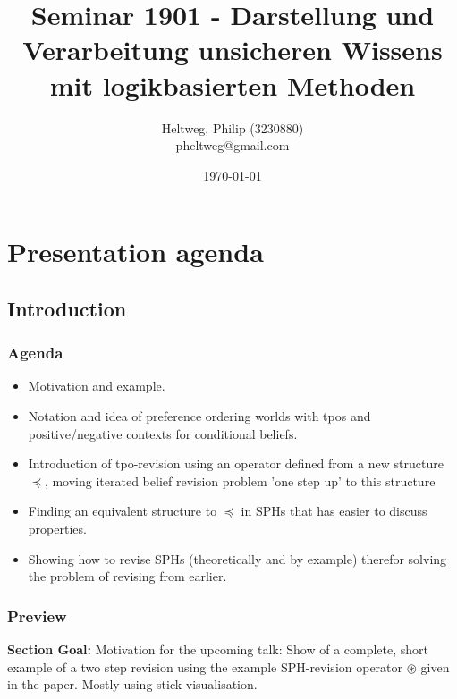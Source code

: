\documentclass[11pt]{article}
\begin{document}
\title{Seminar 1901 - Darstellung und Verarbeitung unsicheren Wissens mit logikbasierten Methoden}
\author{
	Heltweg, Philip (3230880) \\
	pheltweg@gmail.com
}
\date{\today}
\maketitle

\newpage

\tableofcontents

\newpage

\section{Presentation agenda}
\subsection{Introduction}
\subsubsection{Agenda}
\begin{itemize}
    \item Motivation and example.
    \item Notation and idea of preference ordering worlds with tpos and positive/negative contexts for conditional beliefs.
    \item Introduction of tpo-revision using an operator defined from a new structure $\preceq$, moving iterated belief revision problem 'one step up' to this structure
    \item Finding an equivalent structure to $\preceq$ in SPHs that has easier to discuss properties.
    \item Showing how to revise SPHs (theoretically and by example) therefor solving the problem of revising from earlier.
\end{itemize}

\subsubsection{Preview}
\textbf{Section Goal:} Motivation for the upcoming talk: Show of a complete, short example of a two step revision using the example SPH-revision operator $\circledast$ given in the paper. Mostly using stick visualisation.
\end{document}
